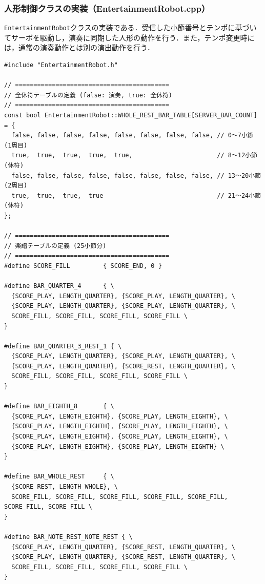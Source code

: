 \subsubsection{人形制御クラスの実装（EntertainmentRobot.cpp）}
\texttt{EntertainmentRobot}クラスの実装である．受信した小節番号とテンポに基づいてサーボを駆動し，演奏に同期した人形の動作を行う．また，テンポ変更時には，通常の演奏動作とは別の演出動作を行う．

\begin{lstlisting}
#include "EntertainmentRobot.h"

// ==========================================
// 全休符テーブルの定義 (false: 演奏, true: 全休符)
// ==========================================
const bool EntertainmentRobot::WHOLE_REST_BAR_TABLE[SERVER_BAR_COUNT] = {
  false, false, false, false, false, false, false, false, // 0〜7小節 (1周目)
  true,  true,  true,  true,  true,                       // 8〜12小節 (休符)
  false, false, false, false, false, false, false, false, // 13〜20小節 (2周目)
  true,  true,  true,  true                               // 21〜24小節 (休符)
};

// ==========================================
// 楽譜テーブルの定義 (25小節分)
// ==========================================
#define SCORE_FILL         { SCORE_END, 0 }

#define BAR_QUARTER_4      { \
  {SCORE_PLAY, LENGTH_QUARTER}, {SCORE_PLAY, LENGTH_QUARTER}, \
  {SCORE_PLAY, LENGTH_QUARTER}, {SCORE_PLAY, LENGTH_QUARTER}, \
  SCORE_FILL, SCORE_FILL, SCORE_FILL, SCORE_FILL \
}

#define BAR_QUARTER_3_REST_1 { \
  {SCORE_PLAY, LENGTH_QUARTER}, {SCORE_PLAY, LENGTH_QUARTER}, \
  {SCORE_PLAY, LENGTH_QUARTER}, {SCORE_REST, LENGTH_QUARTER}, \
  SCORE_FILL, SCORE_FILL, SCORE_FILL, SCORE_FILL \
}

#define BAR_EIGHTH_8       { \
  {SCORE_PLAY, LENGTH_EIGHTH}, {SCORE_PLAY, LENGTH_EIGHTH}, \
  {SCORE_PLAY, LENGTH_EIGHTH}, {SCORE_PLAY, LENGTH_EIGHTH}, \
  {SCORE_PLAY, LENGTH_EIGHTH}, {SCORE_PLAY, LENGTH_EIGHTH}, \
  {SCORE_PLAY, LENGTH_EIGHTH}, {SCORE_PLAY, LENGTH_EIGHTH} \
}

#define BAR_WHOLE_REST     { \
  {SCORE_REST, LENGTH_WHOLE}, \
  SCORE_FILL, SCORE_FILL, SCORE_FILL, SCORE_FILL, SCORE_FILL, SCORE_FILL, SCORE_FILL \
}

#define BAR_NOTE_REST_NOTE_REST { \
  {SCORE_PLAY, LENGTH_QUARTER}, {SCORE_REST, LENGTH_QUARTER}, \
  {SCORE_PLAY, LENGTH_QUARTER}, {SCORE_REST, LENGTH_QUARTER}, \
  SCORE_FILL, SCORE_FILL, SCORE_FILL, SCORE_FILL \
}


\end{lstlisting}
